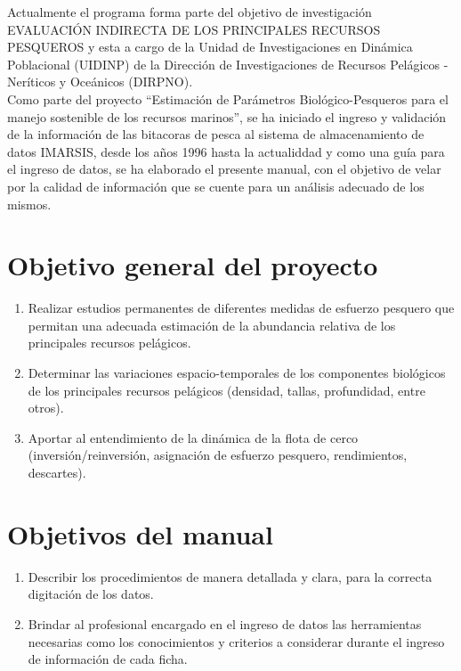 \documentclass[a4paper,oneside,11pt]{book}
\begin{document}
Actualmente el programa forma parte del objetivo de investigación EVALUACIÓN INDIRECTA DE LOS PRINCIPALES RECURSOS PESQUEROS y esta a cargo de la Unidad de Investigaciones en Dinámica Poblacional (UIDINP) de la Dirección de Investigaciones de Recursos Pelágicos - Neríticos y Oceánicos (DIRPNO).\\

Como parte del  proyecto “Estimación de Parámetros Biológico-Pesqueros para el manejo sostenible de los recursos marinos”, se ha iniciado el ingreso y validación de la información de las bitacoras de pesca al sistema de almacenamiento de datos IMARSIS, desde los años 1996 hasta la actualiddad y como una guía para el ingreso de datos, se ha elaborado el presente manual, con el objetivo de velar por la calidad de información que se cuente para un análisis adecuado de los mismos.

\newpage
\section{Objetivo general del proyecto}

\begin{enumerate}
\item Realizar estudios permanentes de diferentes medidas de esfuerzo pesquero que permitan una adecuada estimación de la abundancia relativa de los principales recursos pelágicos.
\item Determinar las variaciones espacio-temporales de los componentes biológicos de los principales recursos pelágicos (densidad, tallas, profundidad, entre otros).
\item Aportar al entendimiento de la dinámica de la flota de cerco (inversión/reinversión, asignación de esfuerzo pesquero, rendimientos, descartes).
\end{enumerate}

\section{Objetivos del manual}

 \begin{enumerate}
 \item Describir los procedimientos de manera detallada y clara, para la correcta digitación de los datos.
  \item Brindar al profesional encargado en el ingreso de datos las herramientas necesarias como los conocimientos y criterios a considerar durante el ingreso de información de cada ficha.
 \end{enumerate}
 
\end{document}
